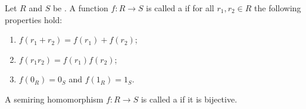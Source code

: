 \begin{definition} \label{definition:semiring_homomorphism}
    Let $R$ and $S$ be . A function $f \colon R \to S$ is called a  if for all $r_1, r_2 \in R$ the following properties hold:
    \begin{enumerate}
        \item $f(r_1 + r_2) = f(r_1) + f(r_2)$;
        \item $f(r_1 r_2) = f(r_1) f(r_2)$;
        \item $f(0_R) = 0_S$ and $f(1_R) = 1_S$.
    \end{enumerate}

    A semiring homomorphism $f \colon R \to S$ is called a  if it is bijective.
\end{definition}
